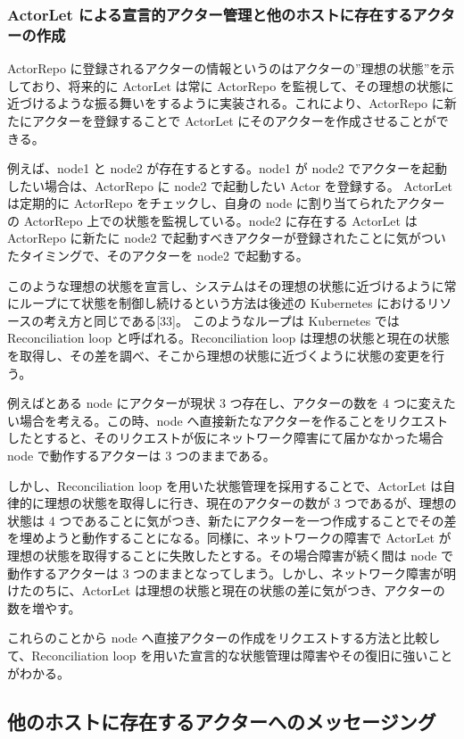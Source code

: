 \subsubsection{ActorLet による宣言的アクター管理と他のホストに存在するアクターの作成}

ActorRepo
に登録されるアクターの情報というのはアクターの''理想の状態''を示しており、将来的に
ActorLet は常に ActorRepo
を監視して、その理想の状態に近づけるような振る舞いをするように実装される。これにより、ActorRepo
に新たにアクターを登録することで ActorLet
にそのアクターを作成させることができる。

例えば、node1 と node2 が存在するとする。node1 が node2
でアクターを起動したい場合は、ActorRepo に node2 で起動したい Actor
を登録する。 ActorLet は定期的に ActorRepo をチェックし、自身の node
に割り当てられたアクターの ActorRepo 上での状態を監視している。node2
に存在する ActorLet は ActorRepo に新たに node2
で起動すべきアクターが登録されたことに気がついたタイミングで、そのアクターを
node2 で起動する。

このような理想の状態を宣言し、システムはその理想の状態に近づけるように常にループにて状態を制御し続けるという方法は後述の
Kubernetes におけるリソースの考え方と同じである{[}33{]}。
このようなループは Kubernetes では Reconciliation loop
と呼ばれる。Reconciliation loop
は理想の状態と現在の状態を取得し、その差を調べ、そこから理想の状態に近づくように状態の変更を行う。

例えばとある node にアクターが現状 3 つ存在し、アクターの数を 4
つに変えたい場合を考える。この時、node
へ直接新たなアクターを作ることをリクエストしたとすると、そのリクエストが仮にネットワーク障害にて届かなかった場合
node で動作するアクターは 3 つのままである。

しかし、Reconciliation loop を用いた状態管理を採用することで、ActorLet
は自律的に理想の状態を取得しに行き、現在のアクターの数が 3
つであるが、理想の状態は 4
つであることに気がつき、新たにアクターを一つ作成することでその差を埋めようと動作することになる。同様に、ネットワークの障害で
ActorLet
が理想の状態を取得することに失敗したとする。その場合障害が続く間は node
で動作するアクターは 3
つのままとなってしまう。しかし、ネットワーク障害が明けたのちに、ActorLet
は理想の状態と現在の状態の差に気がつき、アクターの数を増やす。

これらのことから node
へ直接アクターの作成をリクエストする方法と比較して、Reconciliation loop
を用いた宣言的な状態管理は障害やその復旧に強いことがわかる。

\subsection{他のホストに存在するアクターへのメッセージング}

